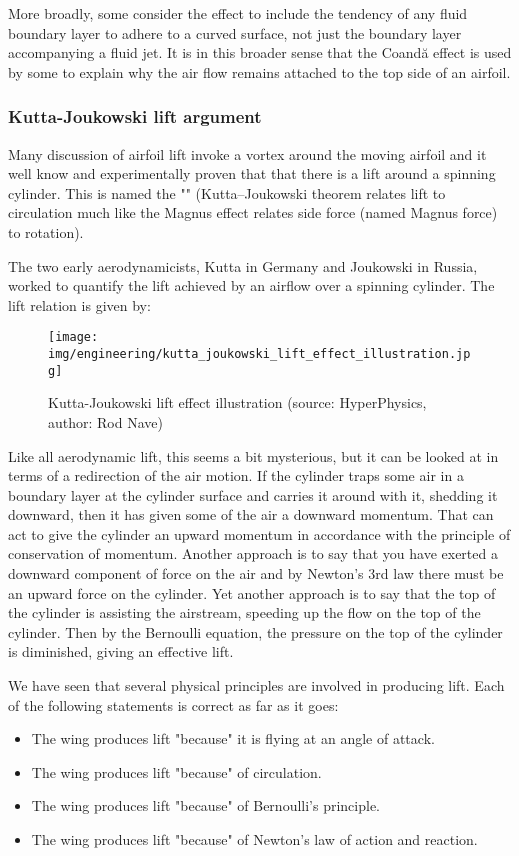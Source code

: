 	More broadly, some consider the effect to include the tendency of any fluid boundary layer to adhere to a curved surface, not just the boundary layer accompanying a fluid jet. It is in this broader sense that the Coandă effect is used by some to explain why the air flow remains attached to the top side of an airfoil.
	
	\subsubsection{Kutta-Joukowski lift argument}
	Many discussion of airfoil lift invoke a vortex around the moving airfoil and it well know and experimentally proven that that there is a lift around a spinning cylinder. This is named the "" (Kutta–Joukowski theorem relates lift to circulation much like the Magnus effect relates side force (named Magnus force) to rotation).
	
	The two early aerodynamicists, Kutta in Germany and Joukowski in Russia, worked to quantify the lift achieved by an airflow over a spinning cylinder. The lift relation is given by:
	
	\begin{figure}[H]
		\centering
		\texttt{[image: img/engineering/kutta\_joukowski\_lift\_effect\_illustration.jpg]}
		\caption[Kutta-Joukowski lift effect illustration]{Kutta-Joukowski lift effect illustration (source: HyperPhysics, author: Rod Nave)}
	\end{figure}
	Like all aerodynamic lift, this seems a bit mysterious, but it can be looked at in terms of a redirection of the air motion. If the cylinder traps some air in a boundary layer at the cylinder surface and carries it around with it, shedding it downward, then it has given some of the air a downward momentum. That can act to give the cylinder an upward momentum in accordance with the principle of conservation of momentum. Another approach is to say that you have exerted a downward component of force on the air and by Newton's 3rd law there must be an upward force on the cylinder. Yet another approach is to say that the top of the cylinder is assisting the airstream, speeding up the flow on the top of the cylinder. Then by the Bernoulli equation, the pressure on the top of the cylinder is diminished, giving an effective lift.
	
	We have seen that several physical principles are involved in producing lift. Each of the following statements is correct as far as it goes:
	\begin{itemize}
		\item The wing produces lift "because" it is flying at an angle of attack.
		\item The wing produces lift "because" of circulation.
		\item The wing produces lift "because" of Bernoulli's principle.
		\item The wing produces lift "because" of Newton's law of action and reaction.
	\end{itemize}

